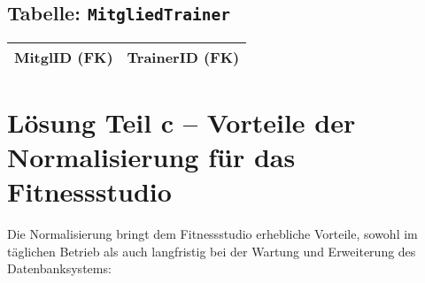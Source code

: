 \documentclass{article}
\begin{document}
	\vspace{1em}
	
	\subsection*{Tabelle: \texttt{MitgliedTrainer}}
	\begin{tabular}{|l|l|}
		\hline
		MitglID (FK) & TrainerID (FK) \\
		\hline
	\end{tabular}
	
		\section*{Lösung Teil c – Vorteile der Normalisierung für das Fitnessstudio}
	
	Die Normalisierung bringt dem Fitnessstudio erhebliche Vorteile, sowohl im täglichen Betrieb als auch langfristig bei der Wartung und Erweiterung des Datenbanksystems:
	
\end{document}
